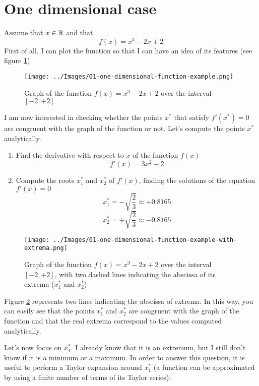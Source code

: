 \section{One dimensional case}
    Assume that \(x \in \mathbb{R}\) and that
    \[f(x) = x^3 - 2x + 2\]
    First of all, I can plot the function so that I can have an idea of its features (see figure \ref{one-dimensional-function}).
    \begin{figure}
        \centering
        \texttt{[image: ../Images/01-one-dimensional-function-example.png]}
        \caption{Graph of the function \(f(x) = x^3 - 2x + 2\) over the interval \([-2, +2]\)}
        \label{one-dimensional-function}
    \end{figure}
    I am now interested in checking whether the points \(x^*\) that satisfy \(f'(x^*) = 0\) are congruent with the graph of the function or not. Let's compute the points \(x^*\) analytically.
    \begin{enumerate}
        \item Find the derivative with respect to \(x\) of the function \(f(x)\)
        \[f'(x) = 3x^2 - 2\]
        \item Compute the roots \(x^{*}_{1}\) and \(x^{*}_{2}\) of \(f'(x)\), finding the solutions of the equation \(f'(x) = 0\)
        \[x^{*}_{1} = -\sqrt{\frac{2}{3}} \approx +0.8165\]
        \[x^{*}_{2} = +\sqrt{\frac{2}{3}} \approx -0.8165\]
    \end{enumerate}
    \begin{figure}
        \centering
        \texttt{[image: ../Images/01-one-dimensional-function-example-with-extrema.png]}
        \caption{Graph of the function \(f(x) = x^3 - 2x + 2\) over the interval \([-2, +2]\), with two dashed lines indicating the abscissa of its extrema (\(x^{*}_{1}\) and \(x^{*}_{2}\))}
        \label{one-dimensional-function-with-extrema}
    \end{figure}
    Figure \ref{one-dimensional-function-with-extrema} represents two lines indicating the abscissa of extrema. In this way, you can easily see that the points \(x^{*}_{1}\) and \(x^{*}_{2}\) are congruent with the graph of the function and that the real extrema correspond to the values computed analytically.\par
    Let's now focus on \(x^{*}_{1}\). I already know that it is an extremum, but I still don't know if it is a minimum or a maximum. In order to answer this question, it is useful to perform a Taylor expansion around \(x^{*}_{1}\) (a function can be approximated by using a finite number of terms of its Taylor series):

